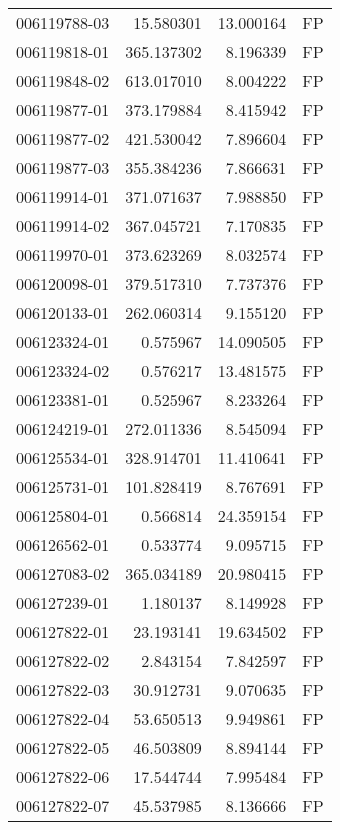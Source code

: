 \begin{tabular}{lrrl}
006119788-03 &   15.580301 &      13.000164 &   FP \\
006119818-01 &  365.137302 &       8.196339 &   FP \\
006119848-02 &  613.017010 &       8.004222 &   FP \\
006119877-01 &  373.179884 &       8.415942 &   FP \\
006119877-02 &  421.530042 &       7.896604 &   FP \\
006119877-03 &  355.384236 &       7.866631 &   FP \\
006119914-01 &  371.071637 &       7.988850 &   FP \\
006119914-02 &  367.045721 &       7.170835 &   FP \\
006119970-01 &  373.623269 &       8.032574 &   FP \\
006120098-01 &  379.517310 &       7.737376 &   FP \\
006120133-01 &  262.060314 &       9.155120 &   FP \\
006123324-01 &    0.575967 &      14.090505 &   FP \\
006123324-02 &    0.576217 &      13.481575 &   FP \\
006123381-01 &    0.525967 &       8.233264 &   FP \\
006124219-01 &  272.011336 &       8.545094 &   FP \\
006125534-01 &  328.914701 &      11.410641 &   FP \\
006125731-01 &  101.828419 &       8.767691 &   FP \\
006125804-01 &    0.566814 &      24.359154 &   FP \\
006126562-01 &    0.533774 &       9.095715 &   FP \\
006127083-02 &  365.034189 &      20.980415 &   FP \\
006127239-01 &    1.180137 &       8.149928 &   FP \\
006127822-01 &   23.193141 &      19.634502 &   FP \\
006127822-02 &    2.843154 &       7.842597 &   FP \\
006127822-03 &   30.912731 &       9.070635 &   FP \\
006127822-04 &   53.650513 &       9.949861 &   FP \\
006127822-05 &   46.503809 &       8.894144 &   FP \\
006127822-06 &   17.544744 &       7.995484 &   FP \\
006127822-07 &   45.537985 &       8.136666 &   FP \\

\end{tabular}
